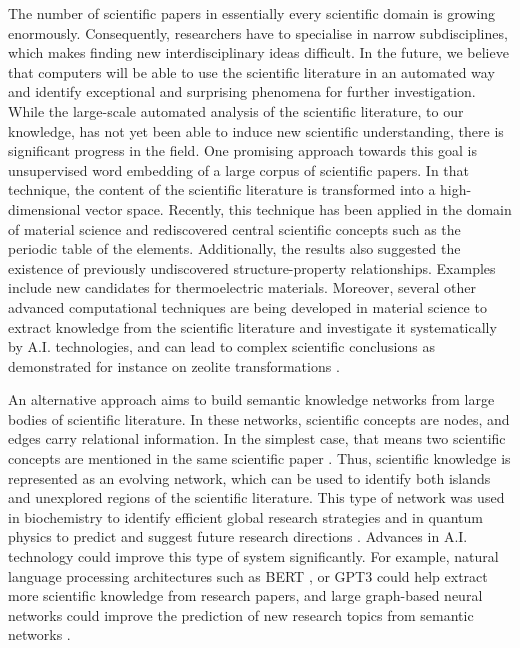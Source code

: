  The number of scientific papers in essentially every scientific domain is growing enormously\cite{larsen2010rate}. Consequently, researchers have to specialise in narrow subdisciplines, which makes finding new interdisciplinary ideas difficult. In the future, we believe that computers will be able to use the scientific literature in an automated way\cite{evans2011metaknowledge,clauset2017data,fortunato2018science,wang2021science} and identify exceptional and surprising phenomena for further investigation. While the large-scale automated analysis of the scientific literature, to our knowledge, has not yet been able to induce new scientific understanding, there is significant progress in the field. One promising approach towards this goal is unsupervised word embedding of a large corpus of scientific papers. In that technique, the content of the scientific literature is transformed into a high-dimensional vector space. Recently, this technique has been applied in the domain of material science \cite{tshitoyan2019unsupervised} and rediscovered central scientific concepts such as the periodic table of the elements. Additionally, the results also suggested the existence of previously undiscovered structure-property relationships. Examples include new candidates for thermoelectric materials. Moreover, several other advanced computational techniques are being developed in material science to extract knowledge from the scientific literature and investigate it systematically by A.I. technologies\cite{olivetti2020data}, and can lead to complex scientific conclusions as demonstrated for instance on zeolite transformations \cite{schwalbe2019graph}.

An alternative approach aims to build semantic knowledge networks from large bodies of scientific literature. In these networks, scientific concepts are nodes, and edges carry relational information. In the simplest case, that means two scientific concepts are mentioned in the same scientific paper \cite{rzhetsky2015choosing,krenn2020predicting}. Thus, scientific knowledge is represented as an evolving network, which can be used to identify both islands and unexplored regions of the scientific literature. This type of network was used in biochemistry to identify efficient global research strategies \cite{rzhetsky2015choosing} and in quantum physics to predict and suggest future research directions \cite{krenn2020predicting}. Advances in A.I. technology could improve this type of system significantly. For example, natural language processing architectures such as BERT \cite{devlin2018bert}, or GPT3 \cite{brown2020language} could help extract more scientific knowledge from research papers, and large graph-based neural networks could improve the prediction of new research topics from semantic networks \cite{hamilton2017inductive}. 

